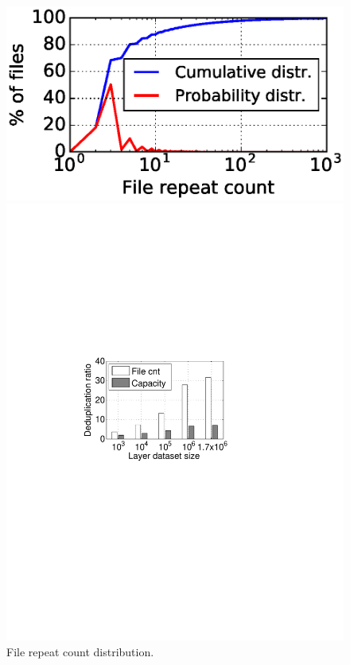 
\begin{figure}[t]
	\centering
	\begin{minipage}{0.2475\textwidth}
		\centering
		\includegraphics[width=1\textwidth]{graphs/File_repeat_count.eps}
		\caption{File repeat count distribution.
		}
		\label{fig:file-repeat-cnt}
	\end{minipage}
	\begin{minipage}{0.22\textwidth}
		\centering
		\includegraphics[width=1\textwidth]{graphs/dedup-ratio-grow} 

\end{minipage}
\end{figure}
